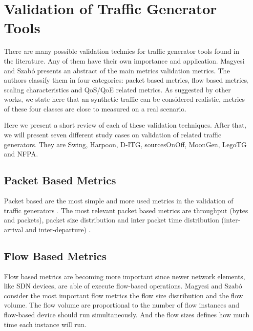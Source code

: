 \section{Validation of Traffic Generator Tools}

There are many possible validation technics for traffic generator tools found in the literature. Any of them have their own importance and application. Magyesi and Szabó\cite{validate-trafficgen} presents an abstract of the main metrics validation metrics. The authors classify them in four categories: packet based metrics, flow based metrics, scaling characteristics and QoS/QoE related metrics. As suggested by other works\cite{swing-paper}, we state here that an synthetic traffic can be considered realistic, metrics of these four classes are close to measured on a real scenario.

Here we present a short review of each of these validation techniques. After that, we will present seven different study cases on validation of related traffic generators. They are Swing\cite{swing-paper}, Harpoon\cite{harpoon-paper}, D-ITG\cite{ditg-paper}, sourcesOnOff\cite{sourcesonoff-paper}, MoonGen\cite{moongen-paper}, LegoTG\cite{legotg-paper} and NFPA\cite{nfpa-paper}.


\subsection{Packet Based Metrics}

Packet based are the most simple and more used metrics in the validation of traffic generators \cite{validate-trafficgen}. The most relevant packet based metrics are throughput\cite{do-you-trust}\cite{comparative-trafficgen-tools}\cite{performance-trafficgen}\cite{moongen-paper} (bytes and packets), packet size distribution\cite{packet-distribution-model} and inter packet time distribution (inter-arrival and inter-departure) \cite{sourcesonoff-paper} \cite{ditg-paper}.       


\subsection{Flow Based Metrics}

Flow based metrics are becoming more important since newer network elements, like SDN devices, are able of execute flow-based operations\cite{validate-trafficgen}\cite{sdn-survey}. Magyesi and Szabó\cite{validate-trafficgen} consider the most important flow metrics the flow size distribution and the flow volume. The flow volume are proportional to the number of flow instances and flow-based device should run simultaneously. And the flow sizes defines how much time each instance will run.


